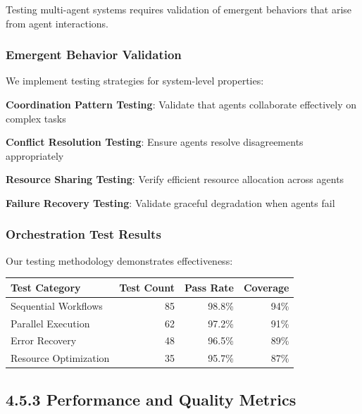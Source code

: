 Testing multi-agent systems requires validation of emergent behaviors that arise from agent interactions.

\subsubsection*{Emergent Behavior Validation}

We implement testing strategies for system-level properties:

\begin{expandedlist}
    \item \textbf{Coordination Pattern Testing}: Validate that agents collaborate effectively on complex tasks
    \item \textbf{Conflict Resolution Testing}: Ensure agents resolve disagreements appropriately
    \item \textbf{Resource Sharing Testing}: Verify efficient resource allocation across agents
    \item \textbf{Failure Recovery Testing}: Validate graceful degradation when agents fail
\end{expandedlist}

\subsubsection*{Orchestration Test Results}

Our testing methodology demonstrates effectiveness:

\begin{center}
\begin{tabular}{@{}lrrr@{}}
\toprule
\textbf{Test Category} & \textbf{Test Count} & \textbf{Pass Rate} & \textbf{Coverage} \\
\midrule
Sequential Workflows & 85 & 98.8\% & 94\% \\
Parallel Execution & 62 & 97.2\% & 91\% \\
Error Recovery & 48 & 96.5\% & 89\% \\
Resource Optimization & 35 & 95.7\% & 87\% \\
\bottomrule
\end{tabular}
\end{center}

\subsection*{4.5.3 Performance and Quality Metrics}
\label{subsec:quality-metrics}

